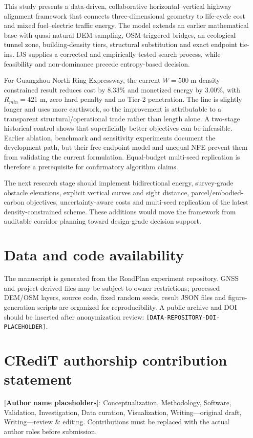\documentclass[preprint,12pt]{elsarticle}
\begin{document}
This study presents a data-driven, collaborative horizontal--vertical highway alignment framework that connects three-dimensional geometry to life-cycle cost and mixed fuel--electric traffic energy. The model extends an earlier mathematical base with quasi-natural DEM sampling, OSM-triggered bridges, an ecological tunnel zone, building-density tiers, structural substitution and exact endpoint tie-ins. IJS supplies a corrected and empirically tested search process, while feasibility and non-dominance precede entropy-based decision.

For Guangzhou North Ring Expressway, the current $W=500$-m density-constrained result reduces cost by 8.33\% and monetized energy by 3.00\%, with $R_{min}=421$ m, zero hard penalty and no Tier-2 penetration. The line is slightly longer and uses more earthwork, so the improvement is attributable to a transparent structural/operational trade rather than length alone. A two-stage historical control shows that superficially better objectives can be infeasible. Earlier ablation, benchmark and sensitivity experiments document the development path, but their free-endpoint model and unequal NFE prevent them from validating the current formulation. Equal-budget multi-seed replication is therefore a prerequisite for confirmatory algorithm claims.

The next research stage should implement bidirectional energy, survey-grade obstacle elevations, explicit vertical curves and sight distance, parcel/embodied-carbon objectives, uncertainty-aware costs and multi-seed replication of the latest density-constrained scheme. These additions would move the framework from auditable corridor planning toward design-grade decision support.

\section*{Data and code availability}
The manuscript is generated from the RoadPlan experiment repository. GNSS and project-derived files may be subject to owner restrictions; processed DEM/OSM layers, source code, fixed random seeds, result JSON files and figure-generation scripts are organized for reproducibility. A public archive and DOI should be inserted after anonymization review: \nolinkurl{[DATA-REPOSITORY-DOI-PLACEHOLDER]}.

\section*{CRediT authorship contribution statement}
\textbf{[Author name placeholders]}: Conceptualization, Methodology, Software, Validation, Investigation, Data curation, Visualization, Writing---original draft, Writing---review \& editing. Contributions must be replaced with the actual author roles before submission.
\end{document}
